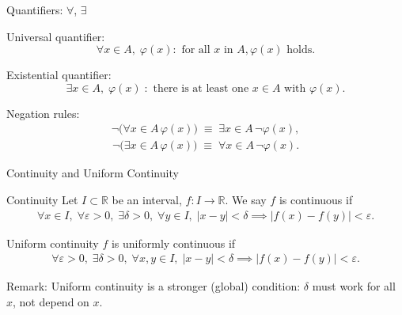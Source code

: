 \begin{frame}{Quantifiers: $\forall$, $\exists$}
  \begin{block}{Universal quantifier:}
  $$\forall x \in A,\; \varphi(x):\!\! \text{ for all } x \text{ in } A, \varphi(x)\text{ holds.}$$
  \end{block}
  \begin{block}{Existential quantifier:}
  $$\exists x \in A,\; \varphi(x) \;:\!\! \text{ there is at least one } x \in A \text{ with } \varphi(x).$$
\end{block}

Negation rules:
\begin{align*}
  \neg \bigl(\forall x \in A\, \varphi(x)\bigr) \;\equiv\; \exists x \in A\, \neg\varphi(x),
\end{align*}
\begin{align*}
  \neg \bigl(\exists x \in A\, \varphi(x)\bigr) \;\equiv\; \forall x \in A\, \neg\varphi(x).
\end{align*}
\end{frame}

\begin{frame}{Continuity and Uniform Continuity}
\begin{block}{Continuity}
Let \(I \subset \mathbb{R}\) be an interval, \(f: I \to \mathbb{R}\). We say \(f\) is continuous if
\begin{align*}
\forall x \in I,\; \forall \varepsilon>0,\; \exists \delta>0,\; \forall y \in I,\;
|x-y|<\delta \implies |f(x) - f(y)| < \varepsilon.
\end{align*}
\end{block}
\begin{block}{Uniform continuity} \(f\) is uniformly continuous if
\begin{align*}
\forall \varepsilon>0,\; \exists \delta>0,\; \forall x,y \in I,\;
|x-y|<\delta \implies |f(x) - f(y)| < \varepsilon.
\end{align*}
\end{block}
\vspace{-0.8cm}
\begin{block}{Remark:}
    Uniform continuity is a stronger (global) condition: \(\delta\) must work for all \(x\), not depend on \(x\).
\end{block}
\end{frame}


